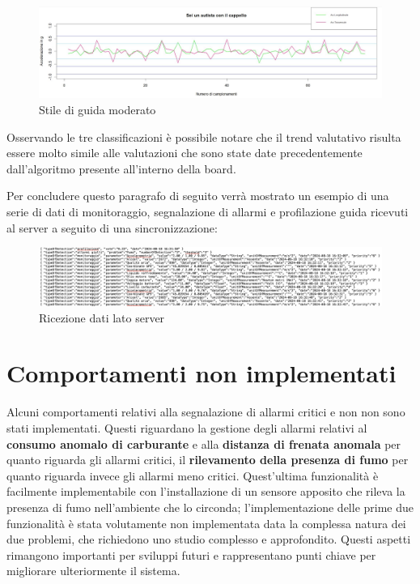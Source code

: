 \documentclass[12pt, a4paper, italian]{report}
\numberwithin{figure}{chapter}
\numberwithin{table}{chapter}
\begin{document}
\begin{figure}[h]
  \centering
  \includegraphics[width=14cm]{GuidaModerata.png}
  \caption{Stile di guida moderato}
  \label{Guida moderata}
\end{figure}

\newpage

Osservando le tre classificazioni è possibile notare che il trend valutativo risulta essere molto simile alle valutazioni che sono state date precedentemente dall'algoritmo presente all'interno della board. 

\vspace{1cm}

Per concludere questo paragrafo di seguito verrà mostrato un esempio di una serie di dati di monitoraggio, segnalazione di allarmi e profilazione guida ricevuti al server a seguito di una sincronizzazione:

\begin{figure}[h]
  \centering
  \includegraphics[width=16cm]{datiServer.png}
  \caption{Ricezione dati lato server}
  \label{fig:datiServer}
\end{figure}

\newpage

\section{Comportamenti non implementati}
Alcuni comportamenti relativi alla segnalazione di allarmi critici e non non sono stati implementati. Questi riguardano la gestione degli allarmi relativi al \textbf{consumo anomalo di carburante} e alla \textbf{distanza di frenata anomala} per quanto riguarda gli allarmi critici, il \textbf{rilevamento della presenza di fumo} per quanto riguarda invece gli allarmi meno critici. Quest'ultima funzionalità è facilmente implementabile con l'installazione di un sensore apposito che rileva la presenza di fumo nell'ambiente che lo circonda; l'implementazione delle prime due funzionalità è stata volutamente non implementata data la complessa natura dei due problemi, che richiedono uno studio complesso e approfondito. Questi aspetti rimangono importanti per sviluppi futuri e rappresentano punti chiave per migliorare ulteriormente il sistema.
\end{document}
